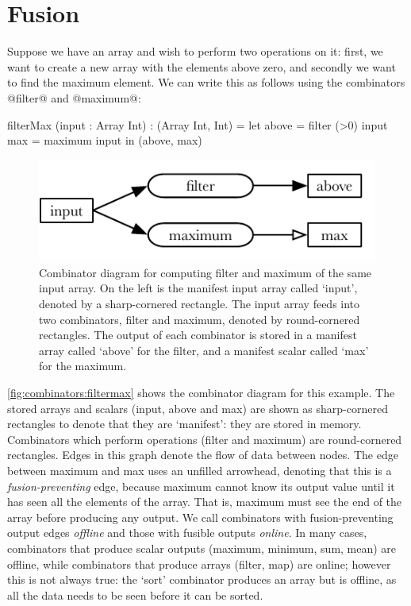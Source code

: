 \section{Fusion}

Suppose we have an array and wish to perform two operations on it: first, we want to create a new array with the elements above zero, and secondly we want to find the maximum element.
We can write this as follows using the combinators @filter@ and @maximum@:

\begin{code}
filterMax (input : Array Int) : (Array Int, Int)
 = let above = filter (>0) input
       max   = maximum     input
   in (above, max)
\end{code}

\begin{figure}
\center
\includegraphics{figs/combinators/filtermax.pdf}
\caption[Combinator diagram for filterMax]
{Combinator diagram for computing filter and maximum of the same input array.
On the left is the manifest input array called `input', denoted by a sharp-cornered rectangle.
The input array feeds into two combinators, filter and maximum, denoted by round-cornered rectangles.
The output of each combinator is stored in a manifest array called `above' for the filter, and a manifest scalar called `max' for the maximum.}
\label{fig:combinators:filtermax}
\end{figure}


\autoref{fig:combinators:filtermax} shows the combinator diagram for this example.
The stored arrays and scalars (input, above and max) are shown as sharp-cornered rectangles to denote that they are `manifest': they are stored in memory.
Combinators which perform operations (filter and maximum) are round-cornered rectangles.
Edges in this graph denote the flow of data between nodes.
The edge between maximum and max uses an unfilled arrowhead, denoting that this is a \emph{fusion-preventing} edge, because maximum cannot know its output value until it has seen all the elements of the array.
That is, maximum must see the end of the array before producing any output.
We call combinators with fusion-preventing output edges \emph{offline} and those with fusible outputs \emph{online}.
In many cases, combinators that produce scalar outputs (maximum, minimum, sum, mean) are offline, while combinators that produce arrays (filter, map) are online; however this is not always true: the `sort' combinator produces an array but is offline, as all the data needs to be seen before it can be sorted.


